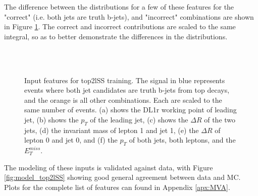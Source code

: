 The difference between the distributions for a few of these features for the "correct" (i.e. both jets are truth b-jets), and "incorrect" combinations are shown in Figure \ref{fig:features_top2lSS}. The correct and incorrect contributions are scaled to the same integral, so as to better demonstrate the differences in the distributions.

\begin{figure}[H]
    \centering
    \\
    \\
    \caption{Input features for top2lSS training. The signal in blue represents events where both jet candidates are truth b-jets from top decays, and the orange is all other combinations. Each are scaled to the same number of events. (a) shows the DL1r working point of leading jet, (b) shows the $p_T$ of the leading jet, (c) shows the $\Delta R$ of the two jets, (d) the invariant mass of lepton 1 and jet 1, (e) the $\Delta R$ of lepton 0 and jet 0, and (f) the $p_T$ of both jets, both leptons, and the $E_T^{miss}$.}
    \label{fig:features_top2lSS}                                                                                        
\end{figure}

The modeling of these inputs is validated against data, with Figure \ref{fig:model_top2lSS} showing good general agreement between data and MC. Plots for the complete list of features can found in Appendix \ref{apx:MVA}.

